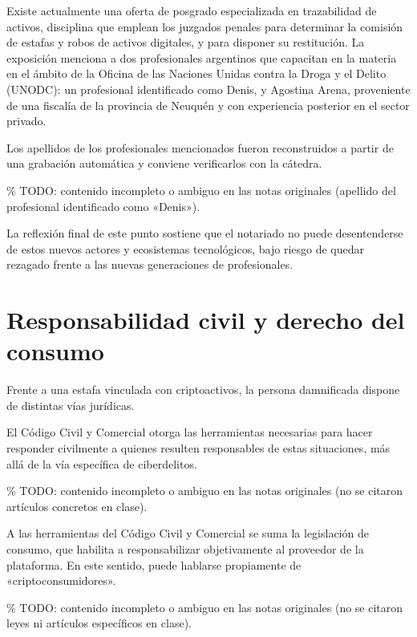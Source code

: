 \documentclass[12pt,oneside]{book}
\begin{document}
Existe actualmente una oferta de posgrado especializada en trazabilidad de activos, disciplina que emplean los juzgados penales para determinar la comisión de estafas y robos de activos digitales, y para disponer su restitución. La exposición menciona a dos profesionales argentinos que capacitan en la materia en el ámbito de la Oficina de las Naciones Unidas contra la Droga y el Delito (UNODC): un profesional identificado como Denis, y Agostina Arena, proveniente de una fiscalía de la provincia de Neuquén y con experiencia posterior en el sector privado.

\begin{note}
Los apellidos de los profesionales mencionados fueron reconstruidos a partir de una grabación automática y conviene verificarlos con la cátedra.

\% TODO: contenido incompleto o ambiguo en las notas originales (apellido del profesional identificado como «Denis»).
\end{note}

La reflexión final de este punto sostiene que el notariado no puede desentenderse de estos nuevos actores y ecosistemas tecnológicos, bajo riesgo de quedar rezagado frente a las nuevas generaciones de profesionales.

\section{Responsabilidad civil y derecho del consumo}

Frente a una estafa vinculada con criptoactivos, la persona damnificada dispone de distintas vías jurídicas.

\begin{important}
El Código Civil y Comercial otorga las herramientas necesarias para hacer responder civilmente a quienes resulten responsables de estas situaciones, más allá de la vía específica de ciberdelitos.

\% TODO: contenido incompleto o ambiguo en las notas originales (no se citaron artículos concretos en clase).
\end{important}

\begin{important}
A las herramientas del Código Civil y Comercial se suma la legislación de consumo, que habilita a responsabilizar objetivamente al proveedor de la plataforma. En este sentido, puede hablarse propiamente de «criptoconsumidores».

\% TODO: contenido incompleto o ambiguo en las notas originales (no se citaron leyes ni artículos específicos en clase).
\end{important}
\end{document}
